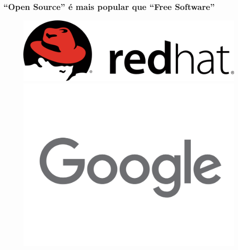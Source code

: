 \documentclass[xcolor=dvipsnames]{beamer}
\begin{document}
\begin{frame}
	\frametitle{``Open Source'' é mais popular que ``Free Software''}
	\begin{figure}
	\begin{center}
	\includegraphics[scale=0.20]{redhat.png}
	\includegraphics[scale=0.10]{google.png}

\end{center}
\end{figure}
\end{frame}
\end{document}

